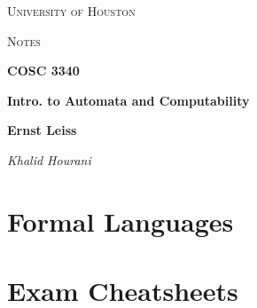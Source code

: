 \documentclass[a4paper]{article}
\theoremstyle{definition}
\begin{document}
\begin{titlepage}
	\centering
	{\scshape\LARGE University of Houston\par}
	\vspace{1cm}
	{\scshape\Large Notes \par}
	\vspace{1.5cm}
	{\huge\bfseries COSC 3340 \par}
	{\huge\bfseries Intro. to Automata and Computability \par}
	\vspace{0.5cm}
	{\large\bfseries Ernst Leiss\par}
	\vspace{1cm}
	{\Large\itshape Khalid Hourani}
	\vspace{0.5cm}
	{\large \par} %
	\vfill
\end{titlepage}

\tableofcontents
\newpage{}

\section{Formal Languages}\label{sec:introduction}





\section{Exam Cheatsheets}

\end{document}
